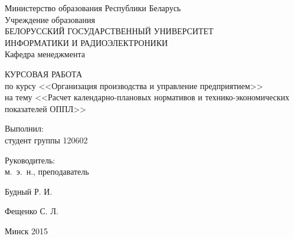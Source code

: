 \begin{titlepage}
\thispagestyle{empty}
\setlength{\parindent}{0mm} %

\begin{center}
  Министерство образования Республики Беларусь \\
  \bigskip
  Учреждение образования \\
  БЕЛОРУССКИЙ ГОСУДАРСТВЕННЫЙ УНИВЕРСИТЕТ \\
  ИНФОРМАТИКИ И РАДИОЭЛЕКТРОНИКИ \\
  \bigskip
  \bigskip
  Кафедра менеджмента
\end{center}

\vspace{50mm}

\begin{center}
  {\LARGE КУРСОВАЯ РАБОТА} \\
  по курсу <<Организация производства и управление предприятием>> \\
  на тему <<Расчет календарно-плановых нормативов и
  технико-экономических показателей ОППЛ>>\\
\end{center}

\vspace{30mm}

\begin{minipage}{.65\linewidth}
    Выполнил: \\
    студент группы 120602 

    \bigskip

    Руководитель: \\
    м.~э.~н., преподаватель
\end{minipage}
\hfill
\begin{minipage}{.25\linewidth}
  \vspace{8mm}
  Будный Р. И.

  \vspace{10mm}
  Фещенко С. Л.
\end{minipage}

\vspace{45mm}
\begin{center}
  Минск 2015
\end{center}

\setlength{\parindent}{5ex} %
\end{titlepage}